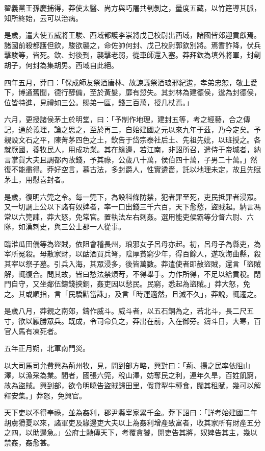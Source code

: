 \begin{pinyinscope}
翟義黨王孫慶捕得，莽使太醫、尚方與巧屠共刳剝之，量度五藏，以竹筳導其脈，知所終始，云可以治病。

是歲，遣大使五威將王駿、西域都護李崇將戊己校尉出西域，諸國皆郊迎貢獻焉。諸國前殺都護但欽，駿欲襲之，命佐帥何封、戊己校尉郭欽別將。焉耆詐降，伏兵擊駿等，皆死。欽、封後到，襲擊老弱，從車師還入塞。莽拜欽為填外將軍，封劋胡子，何封為集胡男。西域自此絕。

四年五月，莽曰：「保成師友祭酒唐林、故諫議祭酒琅邪紀逡，孝弟忠恕，敬上愛下，博通舊聞，德行醇備，至於黃髮，靡有愆失。其封林為建德侯，逡為封德侯，位皆特進，見禮如三公。賜弟一區，錢三百萬，授几杖焉。」

六月，更授諸侯茅土於明堂，曰：「予制作地理，建封五等，考之經藝，合之傳記，通於義理，論之思之，至於再三，自始建國之元以來九年于茲，乃今定矣。予親設文石之平，陳菁茅四色之土，欽告于岱宗泰社后土、先祖先妣，以班授之。各就厥國，養牧民人，用成功業。其在緣邊，若江南，非詔所召，遣侍于帝城者，納言掌貨大夫且調都內故錢，予其祿，公歲八十萬，侯伯四十萬，子男二十萬。」然復不能盡得。莽好空言，慕古法，多封爵人，性實遴嗇，託以地理未定，故且先賦茅土，用慰喜封者。

是歲，復明六筦之令。每一筦下，為設科條防禁，犯者罪至死，吏民抵罪者浸眾。又一切調上公以下諸有奴婢者，率一口出錢三千六百，天下愈愁，盜賊起。納言馮常以六筦諫，莽大怒，免常官。置執法左右刺姦。選用能吏侯霸等分督六尉、六隊，如漢刺史，與三公士郡一人從事。

臨淮瓜田儀等為盜賊，依阻會稽長州，琅邪女子呂母亦起。初，呂母子為縣吏，為宰所冤殺。母散家財，以酤酒買兵弩，陰厚貧窮少年，得百餘人，遂攻海曲縣，殺其宰以祭子墓。引兵入海，其眾浸多，後皆萬數。莽遣使者即赦盜賊，還言「盜賊解，輒復合。問其故，皆曰愁法禁煩苛，不得舉手。力作所得，不足以給貢稅。閉門自守，又坐鄰伍鑄錢挾銅，姦吏因以愁民。民窮，悉起為盜賊。」莽大怒，免之。其或順指，言「民驕黠當誅」，及言「時運適然，且滅不久」，莽說，輒遷之。

是歲八月，莽親之南郊，鑄作威斗。威斗者，以五石銅為之，若北斗，長二尺五寸，欲以厭勝眾兵。既成，令司命負之，莽出在前，入在御旁。鑄斗日，大寒，百官人馬有凍死者。

五年正月朔，北軍南門災。

以大司馬司允費興為荊州牧，見，問到部方略，興對曰：「荊、揚之民率依阻山澤，以漁采為業。間者，國張六筦，稅山澤，妨奪民之利，連年久旱，百姓飢窮，故為盜賊。興到部，欲令明曉告盜賊歸田里，假貸犁牛種食，闊其租賦，幾可以解釋安集。」莽怒，免興官。

天下吏以不得奉祿，並為姦利，郡尹縣宰家累千金。莽下詔曰：「詳考始建國二年胡虜猾夏以來，諸軍吏及緣邊吏大夫以上為姦利增產致富者，收其家所有財產五分之四，以助邊急。」公府士馳傳天下，考覆貪饕，開吏告其將，奴婢告其主，幾以禁姦，姦愈甚。


\end{pinyinscope}
